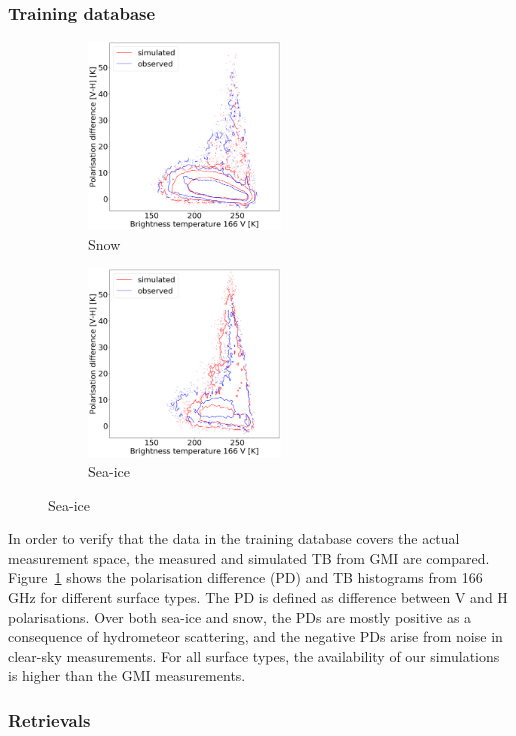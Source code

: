 \documentclass[12pt,oneside,a4paper]{article}
\begin{document}
\subsubsection{Training database}
%
\begin{figure}[t]
	\centering
	\caption{}
	\begin{subfigure}{.45\textwidth}
		\caption{ Snow}
		\includegraphics[height = 50mm]{Figures/hist2d_gmi_45-60_snow.png}
	\end{subfigure}
	\begin{subfigure}{.45\textwidth}
		\caption{ Sea-ice}
		\includegraphics[height = 50mm]{Figures/hist2d_gmi_highlat_sea-ice.png}
	\end{subfigure}
	\label{fig:histogram_2d}
\end{figure}

In order to verify that the data in the training database covers the actual measurement space, the measured and simulated TB from GMI are compared. Figure~\ref{fig:histogram_2d} shows the polarisation difference (PD) and TB histograms from 166 GHz for different surface types. The PD is defined as difference between V and H polarisations. Over both sea-ice and snow, the PDs are mostly positive as a consequence of hydrometeor scattering, and the negative PDs arise from noise in clear-sky measurements. For all surface types, the availability of our simulations is higher than the GMI measurements. 
\subsubsection{Retrievals}
\end{document}
